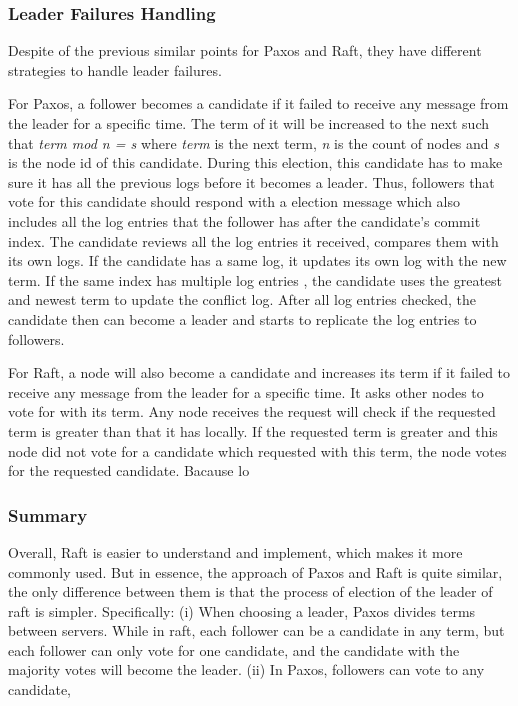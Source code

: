 \documentclass[12pt, a4paper]{article}
\begin{document}
\subsubsection{Leader Failures Handling}
Despite of the previous similar points for Paxos and Raft, they have different
strategies to handle leader failures.

For Paxos, a follower becomes a candidate if it failed to receive any message
from the leader for a specific time. 
The term of it will be increased to the next such that 
\textit{term mod n = s} where \textit{term} is the next term, 
\textit{n} is the count of nodes and \textit{s} is the node id of this candidate. 
During this election, this candidate has to make sure it has all the previous logs
before it becomes a leader. Thus, followers that vote for this candidate should respond
with a election message which also includes all the log entries that the follower
has after the candidate’s commit index.
The candidate reviews all the log entries it received, compares them with its own logs.
If the candidate has a same log, it updates its own log with the new term.
If the same index has multiple log entries , the candidate uses the 
greatest and newest term to update the conflict log.
After all log entries checked, the candidate then can become a leader
and starts to replicate the log entries to followers.

For Raft, a node will also become a candidate and increases its term 
if it failed to receive any message from the leader for a specific time. 
It asks other nodes to vote for with its term.
Any node receives the request will check 
if the requested term is greater than that it has locally. 
If the requested term is greater and this node did not vote for a candidate 
which requested with this term, the node votes for the requested candidate.
Bacause lo

\subsubsection{Summary}
Overall, Raft is easier to understand and implement, which makes it more commonly used. But in essence, the approach of Paxos and Raft is quite similar, the only difference between them is that the process of election of the leader of raft is simpler. Specifically: (i) When choosing a leader, Paxos divides terms between servers. While in raft, each follower can be a candidate in any term, but each follower can only vote for one candidate, and the candidate with the majority votes will become the leader. (ii) In Paxos, followers can vote to any candidate, 
\end{document}
